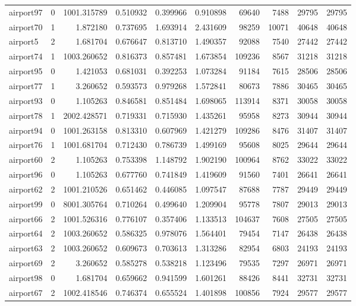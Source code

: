 \begin{longtable}{|l|r|r|r|r|r|r|r|r|r|}
airport97 & 0 & 1001.315789 & 0.510932 & 0.399966 & 0.910898 & 69640 & 7488 & 29795 & 29795 \\
airport70 & 1 & 1.872180 & 0.737695 & 1.693914 & 2.431609 & 98259 & 10071 & 40648 & 40648 \\
airport5 & 2 & 1.681704 & 0.676647 & 0.813710 & 1.490357 & 92088 & 7540 & 27442 & 27442 \\
airport74 & 1 & 1003.260652 & 0.816373 & 0.857481 & 1.673854 & 109236 & 8567 & 31218 & 31218 \\
airport95 & 0 & 1.421053 & 0.681031 & 0.392253 & 1.073284 & 91184 & 7615 & 28506 & 28506 \\
airport77 & 1 & 3.260652 & 0.593573 & 0.979268 & 1.572841 & 80673 & 7886 & 30465 & 30465 \\
airport93 & 0 & 1.105263 & 0.846581 & 0.851484 & 1.698065 & 113914 & 8371 & 30058 & 30058 \\
airport78 & 1 & 2002.428571 & 0.719331 & 0.715930 & 1.435261 & 95958 & 8273 & 30944 & 30944 \\
airport94 & 0 & 1001.263158 & 0.813310 & 0.607969 & 1.421279 & 109286 & 8476 & 31407 & 31407 \\
airport76 & 1 & 1001.681704 & 0.712430 & 0.786739 & 1.499169 & 95608 & 8025 & 29644 & 29644 \\
airport60 & 2 & 1.105263 & 0.753398 & 1.148792 & 1.902190 & 100964 & 8762 & 33022 & 33022 \\
airport96 & 0 & 1.105263 & 0.677760 & 0.741849 & 1.419609 & 91560 & 7401 & 26641 & 26641 \\
airport62 & 2 & 1001.210526 & 0.651462 & 0.446085 & 1.097547 & 87688 & 7787 & 29449 & 29449 \\
airport99 & 0 & 8001.305764 & 0.710264 & 0.499640 & 1.209904 & 95778 & 7807 & 29013 & 29013 \\
airport66 & 2 & 1001.526316 & 0.776107 & 0.357406 & 1.133513 & 104637 & 7608 & 27505 & 27505 \\
airport64 & 2 & 1003.260652 & 0.586325 & 0.978076 & 1.564401 & 79454 & 7147 & 26438 & 26438 \\
airport63 & 2 & 1003.260652 & 0.609673 & 0.703613 & 1.313286 & 82954 & 6803 & 24193 & 24193 \\
airport69 & 2 & 3.260652 & 0.585278 & 0.538218 & 1.123496 & 79535 & 7297 & 26971 & 26971 \\
airport98 & 0 & 1.681704 & 0.659662 & 0.941599 & 1.601261 & 88426 & 8441 & 32731 & 32731 \\
airport67 & 2 & 1002.418546 & 0.746374 & 0.655524 & 1.401898 & 100856 & 7924 & 29577 & 29577 \\

\end{longtable}
